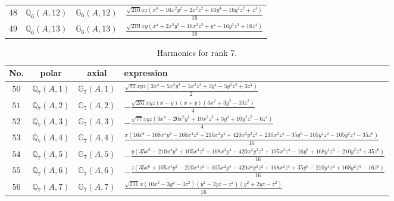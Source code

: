 \documentclass[fleqn,8pt,landscape]{jsarticle}
\begin{document}
\begin{table}[ht!]
\begin{center}
\begin{tabular}{cccl}
$ 48 $ & $ \mathbb{Q}_{6}(A,12) $ & $ \mathbb{G}_{6}(A,12) $ & $ \frac{\sqrt{210} x z \left(x^{4} - 16 x^{2} y^{2} + 2 x^{2} z^{2} + 16 y^{4} - 16 y^{2} z^{2} + z^{4}\right)}{16} $ \\
$ 49 $ & $ \mathbb{Q}_{6}(A,13) $ & $ \mathbb{G}_{6}(A,13) $ & $ \frac{\sqrt{210} x y \left(x^{4} + 2 x^{2} y^{2} - 16 x^{2} z^{2} + y^{4} - 16 y^{2} z^{2} + 16 z^{4}\right)}{16} $ \\
 \hline \hline
\end{tabular}
\end{center}
\end{table}
\begin{table}[ht!]
\begin{center}
\caption{Harmonics for rank 7.}
\renewcommand{\arraystretch}{1.3}
\begin{tabular}{cccl} \hline \hline
No. & polar & axial & expression \\ \hline
$ 50 $ & $ \mathbb{Q}_{7}(A,1) $ & $ \mathbb{G}_{7}(A,1) $ & $ \frac{\sqrt{91} x y z \left(3 x^{4} - 5 x^{2} y^{2} - 5 x^{2} z^{2} + 3 y^{4} - 5 y^{2} z^{2} + 3 z^{4}\right)}{2} $ \\
$ 51 $ & $ \mathbb{Q}_{7}(A,2) $ & $ \mathbb{G}_{7}(A,2) $ & $ - \frac{\sqrt{231} x y z \left(x - y\right) \left(x + y\right) \left(3 x^{2} + 3 y^{2} - 10 z^{2}\right)}{4} $ \\
$ 52 $ & $ \mathbb{Q}_{7}(A,3) $ & $ \mathbb{G}_{7}(A,3) $ & $ - \frac{\sqrt{77} x y z \left(3 x^{4} - 20 x^{2} y^{2} + 10 x^{2} z^{2} + 3 y^{4} + 10 y^{2} z^{2} - 6 z^{4}\right)}{4} $ \\
$ 53 $ & $ \mathbb{Q}_{7}(A,4) $ & $ \mathbb{G}_{7}(A,4) $ & $ \frac{x \left(16 x^{6} - 168 x^{4} y^{2} - 168 x^{4} z^{2} + 210 x^{2} y^{4} + 420 x^{2} y^{2} z^{2} + 210 x^{2} z^{4} - 35 y^{6} - 105 y^{4} z^{2} - 105 y^{2} z^{4} - 35 z^{6}\right)}{16} $ \\
$ 54 $ & $ \mathbb{Q}_{7}(A,5) $ & $ \mathbb{G}_{7}(A,5) $ & $ - \frac{y \left(35 x^{6} - 210 x^{4} y^{2} + 105 x^{4} z^{2} + 168 x^{2} y^{4} - 420 x^{2} y^{2} z^{2} + 105 x^{2} z^{4} - 16 y^{6} + 168 y^{4} z^{2} - 210 y^{2} z^{4} + 35 z^{6}\right)}{16} $ \\
$ 55 $ & $ \mathbb{Q}_{7}(A,6) $ & $ \mathbb{G}_{7}(A,6) $ & $ - \frac{z \left(35 x^{6} + 105 x^{4} y^{2} - 210 x^{4} z^{2} + 105 x^{2} y^{4} - 420 x^{2} y^{2} z^{2} + 168 x^{2} z^{4} + 35 y^{6} - 210 y^{4} z^{2} + 168 y^{2} z^{4} - 16 z^{6}\right)}{16} $ \\
$ 56 $ & $ \mathbb{Q}_{7}(A,7) $ & $ \mathbb{G}_{7}(A,7) $ & $ \frac{\sqrt{231} x \left(10 x^{2} - 3 y^{2} - 3 z^{2}\right) \left(y^{2} - 2 y z - z^{2}\right) \left(y^{2} + 2 y z - z^{2}\right)}{16} $ \\

\end{tabular}
\end{center}
\end{table}
\end{document}
